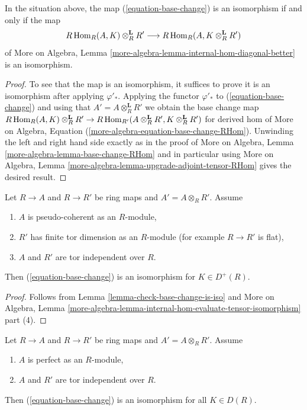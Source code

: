 \begin{lemma}
\label{lemma-check-base-change-is-iso}
In the situation above, the map (\ref{equation-base-change})
is an isomorphism if and only if the map
$$
R\mathop{\mathrm{Hom}}\nolimits_R(A, K) \otimes_R^\mathbf{L} R'
\longrightarrow
R\mathop{\mathrm{Hom}}\nolimits_R(A, K \otimes_R^\mathbf{L} R')
$$
of More on Algebra, Lemma
\ref{more-algebra-lemma-internal-hom-diagonal-better} is an isomorphism.
\end{lemma}

\begin{proof}
To see that the map is an isomorphism, it suffices to prove it
is an isomorphism after applying $\varphi'_*$.
Applying the functor $\varphi'_*$ to (\ref{equation-base-change})
and using that $A' = A \otimes_R^\mathbf{L} R'$
we obtain the base change map
$R\mathop{\mathrm{Hom}}\nolimits_R(A, K) \otimes_R^\mathbf{L} R' \to
R\mathop{\mathrm{Hom}}\nolimits_{R'}(A \otimes_R^\mathbf{L} R', K \otimes_R^\mathbf{L} R')$
for derived hom of
More on Algebra, Equation (\ref{more-algebra-equation-base-change-RHom}).
Unwinding the left and right hand side exactly as in the proof of
More on Algebra, Lemma \ref{more-algebra-lemma-base-change-RHom}
and in particular using
More on Algebra, Lemma \ref{more-algebra-lemma-upgrade-adjoint-tensor-RHom}
gives the desired result.
\end{proof}

\begin{lemma}
\label{lemma-flat-bc-surjection}
Let $R \to A$ and $R \to R'$ be ring maps and $A' = A \otimes_R R'$.
Assume
\begin{enumerate}
\item $A$ is pseudo-coherent as an $R$-module,
\item $R'$ has finite tor dimension as an $R$-module (for example
$R \to R'$ is flat),
\item $A$ and $R'$ are tor independent over $R$.
\end{enumerate}
Then (\ref{equation-base-change}) is an isomorphism for $K \in D^+(R)$.
\end{lemma}

\begin{proof}
Follows from Lemma \ref{lemma-check-base-change-is-iso} and
More on Algebra, Lemma
\ref{more-algebra-lemma-internal-hom-evaluate-tensor-isomorphism} part (4).
\end{proof}

\begin{lemma}
\label{lemma-bc-surjection}
Let $R \to A$ and $R \to R'$ be ring maps and $A' = A \otimes_R R'$.
Assume
\begin{enumerate}
\item $A$ is perfect as an $R$-module,
\item $A$ and $R'$ are tor independent over $R$.
\end{enumerate}
Then (\ref{equation-base-change}) is an isomorphism for all $K \in D(R)$.
\end{lemma}


